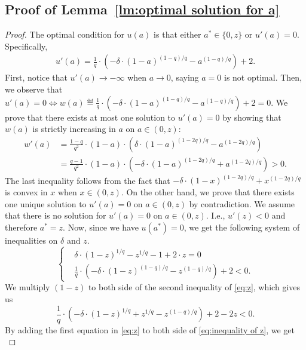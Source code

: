 \subsection{Proof of Lemma~\ref{lm:optimal solution for a}}
\begin{proof}
The optimal condition for $u(a)$ is that either $a^*\in\{0,z\}$ or $u'(a)=0$. Specifically,
\begin{align*}
   u'(a)=\frac{1}{q}\cdot\left(-\delta\cdot(1-a)^{(1-q)/q}-a^{(1-q)/q}\right)+2.
\end{align*}
First, notice that $u'(a)\rightarrow -\infty$ when $a\rightarrow 0$, saying $a=0$ is not optimal.
Then, we observe that $u'(a)=0\Leftrightarrow w(a)\eqdef\frac{1}{q}\cdot\left(-\delta\cdot(1-a)^{(1-q)/q}-a^{(1-q)/q}\right)+2=0$. We prove that there exists at most one solution to $u'(a)=0$ by showing that $w(a)$ is strictly increasing in $a$ on $a\in(0,z)$:
\begin{align*}
  w'(a)&=\frac{1-q}{q^2}\cdot(1-a)\cdot\left(\delta\cdot(1-a)^{(1-2q)/q}-a^{(1-2q)/q}\right) \\
  &= \frac{q-1}{q^2}\cdot(1-a)\cdot\left(-\delta\cdot(1-a)^{(1-2q)/q}+a^{(1-2q)/q}\right)> 0.
\end{align*}
The last inequality follows from the fact that $-\delta\cdot(1-x)^{(1-2q)/q}+x^{(1-2q)/q}$ is convex in $x$ when $x\in(0,z)$.
On the other hand, we prove that there exists one unique solution to $u'(a)=0$ on $a\in(0,z)$ by contradiction. We assume that there is no solution for $u'(a)=0$ on $a\in(0,z)$. I.e., $u'(z)<0$ and therefore $a^*=z$. Now, since we have $u(a^*)=0$, we get the following system of inequalities on $\delta$ and $z$.
\begin{equation}
\label{eq:z}
\left\{
    \begin{aligned}
    &\delta\cdot(1-z)^{1/q}-{z}^{1/q}-1+2\cdot z=0\\
    &\frac{1}{q}\cdot\left(-\delta\cdot(1-z)^{(1-q)/q}-z^{(1-q)/q}\right)+2<0.
    \end{aligned}
    \right.
\end{equation}
We multiply $(1-z)$ to both side of the second inequality of \eqref{eq:z}, which gives us
\begin{equation}
\label{eq:inequality of z}
    \frac{1}{q}\cdot\left(-\delta\cdot(1-z)^{1/q}+z^{1/q}-z^{(1-q)/q}\right)+2-2z<0.
\end{equation}
By adding the first equation in \eqref{eq:z} to both side of \eqref{eq:inequality of z}, we get
\begin{equation}
\label{eq:inequality of z(2)}

\end{equation}
\end{proof}

